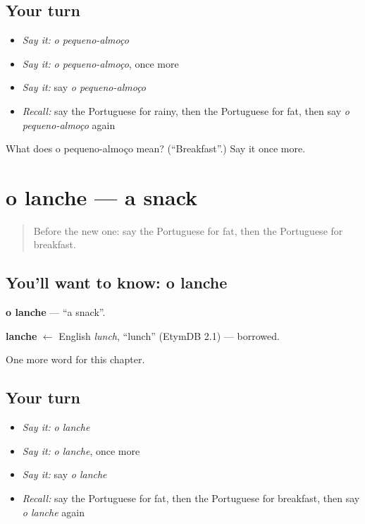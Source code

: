 \subsection*{Your turn}
\begin{itemize}
\raggedright
  \item \emph{Say it:} \emph{o pequeno-almoço}
  \item \emph{Say it:} \emph{o pequeno-almoço}, once more
  \item \emph{Say it:} say \emph{o pequeno-almoço}
  \item \emph{Recall:} say the Portuguese for rainy, then the Portuguese for fat, then say \emph{o pequeno-almoço} again
\end{itemize}

\begin{tcolorbox}[breakable,colback=teal!4,colframe=teal!35!black,title={Before you move on}]
What does o pequeno-almoço mean? (\textquotedblleft{}Breakfast\textquotedblright{}.) Say it once more.
\end{tcolorbox}
\section[o lanche]{o lanche — a snack}

\label{lesson:PT-C218-lanche}



\begin{quote}
Before the new one: say the Portuguese for fat, then the Portuguese for breakfast.
\end{quote}

\subsection*{You'll want to know: o lanche}
\textbf{o lanche} — \textquotedblleft{}a snack\textquotedblright{}.

\begin{cousinweb}
\textbf{lanche} $\leftarrow$ English \emph{lunch}, \textquotedblleft{}lunch\textquotedblright{} (EtymDB 2.1) — borrowed.
\end{cousinweb}

\begin{grammarlens}[title={What you've built}]
One more word for this chapter.
\end{grammarlens}

\subsection*{Your turn}
\begin{itemize}
\raggedright
  \item \emph{Say it:} \emph{o lanche}
  \item \emph{Say it:} \emph{o lanche}, once more
  \item \emph{Say it:} say \emph{o lanche}
  \item \emph{Recall:} say the Portuguese for fat, then the Portuguese for breakfast, then say \emph{o lanche} again
\end{itemize}


